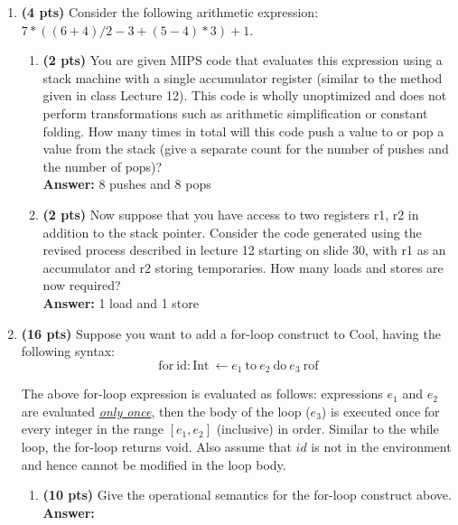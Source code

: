 \documentclass[11pt]{article}
\begin{document}
\begin{enumerate}
\begin{enumerate}
   \newpage
    
  \end{enumerate}
  
  \item \textbf{(4 pts)} Consider the following arithmetic expression: $7*((6+4)/2 - 3 + (5-4)*3) + 1$.
  
  \begin{enumerate}
    \item \textbf{(2 pts)} You are given MIPS code that evaluates this expression using a stack machine with a single accumulator register (similar to the method given in class Lecture 12). This code is wholly unoptimized and does not perform transformations such as arithmetic simplification or constant folding. How many times in total will this code push a value to or pop a value from the stack (give a separate count for the number of pushes and the number of pops)?\\
    \textbf{Answer:} 
    8 pushes and 8 pops
    
    \item \textbf{(2 pts)} Now suppose that you have access to two registers r1, r2 in addition to the stack pointer. Consider the code generated using the revised process described in lecture 12 starting on slide 30, with r1 as an accumulator and r2 storing temporaries. How many loads and stores are now required?\\
    \textbf{Answer:} 
    1 load and 1 store
  \end{enumerate}
  \newpage
    
  \item \textbf{(16 pts)} Suppose you want to add a for-loop construct to Cool, having the following syntax:\\
  
  $$\mbox{for}\ \mbox{id}: \mbox{Int}\ \leftarrow e_1\ \mbox{to}\ e_2\ \mbox{do}\ e_3\ \mbox{rof}$$ 
  
  The above for-loop expression is evaluated as follows: expressions $e_1$ and $e_2$ are evaluated \underline{\emph{only once}}, then the body of the loop ($e_3$) is executed once for every integer in the range $[e_1, e_2]$ (inclusive) in order. Similar to the while loop, the for-loop returns void. Also assume that $id$ is not in the environment and hence cannot be modified in the loop body.
  
   \begin{enumerate}
    \item \textbf{(10 pts)} Give the operational semantics for the for-loop construct above.\\
    \textbf{Answer:} 
    

\end{enumerate}
\end{enumerate}
\end{document}
